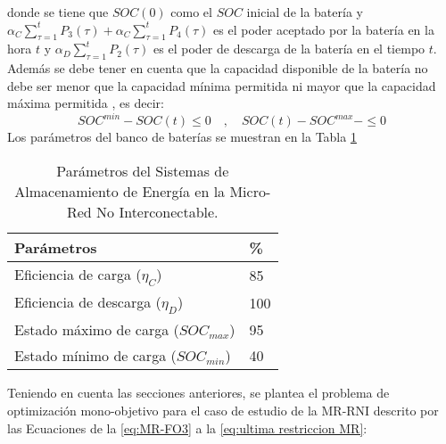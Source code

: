 \begin{itemize}
donde se tiene que $SOC(0)$ como el $SOC$ inicial de la batería y  $\alpha_C\sum_{\tau=1}^{t}P_3(\tau)+\alpha_C \sum_{\tau=1}^{t}P_4(\tau)$ es el poder aceptado por la batería en la hora $t$ y  $\alpha_D \sum_{\tau=1}^{t}P_2(\tau)$ es el poder de descarga de la batería en el tiempo $t$.
Además se debe tener en cuenta que la capacidad disponible de la batería no debe ser menor que la capacidad mínima permitida ni mayor que la capacidad máxima permitida \cite{tazvinga2013minimum}, es decir:
\begin{equation}
SOC^{min}-SOC(t)\leq 0 \quad, \quad SOC(t)-SOC^{max}-\leq 0 
 \end{equation}
 Los parámetros del banco de baterías se muestran en la Tabla \ref{tab:MR-Parámetros del Sistemas de Almacenamiento de Energía}
\begin{table}[]
\centering
\begin{tabular}{ll}
\hline
 Parámetros &   \% \\ \hline
 Eficiencia de carga ($\eta_C$)  & 85 \\
 Eficiencia de descarga ($\eta_D$) & 100  \\
 Estado máximo de carga ($SOC_{max}$)& 95\\ 
 Estado mínimo de carga ($SOC_{min}$)& 40\\
 \hline
\end{tabular}
\caption{Parámetros del Sistemas de Almacenamiento de Energía en la Micro-Red No Interconectable.}
\label{tab:MR-Parámetros del Sistemas de Almacenamiento de Energía}
\end{table}

\end{itemize}
Teniendo en cuenta las secciones anteriores, se plantea el problema de optimización mono-objetivo para el caso de estudio de la MR-RNI descrito por las Ecuaciones de la \ref{eq:MR-FO3} a la \ref{eq:ultima restriccion MR}:

